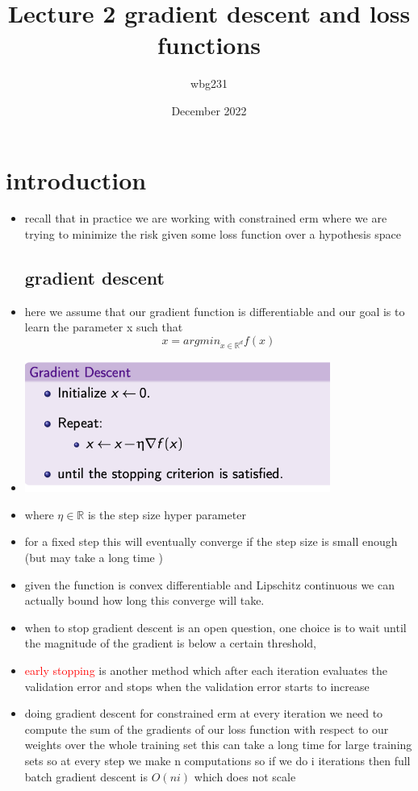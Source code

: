 \documentclass{article}
\title{Lecture 2 gradient descent and loss functions}
\author{wbg231 }
\date{December 2022}
\begin{document}
\maketitle

\section{introduction}
\begin{itemize}
\item recall that in practice we are working with constrained erm where we are trying to minimize the risk given some loss function over a  hypothesis space
\subsection*{gradient descent}
\item here we assume that our gradient function is differentiable and our goal is to learn the parameter x such that $$x=argmin_{x\in \mathbb{R}^d}f(x)$$
\item \includegraphics*[width=10cm]{images/Screenshot 2023-05-10 at 8.19.53 PM.png}
\item where $\eta\in \mathbb{R}$ is the step size hyper parameter
\item for a fixed step this will eventually converge if the step size is small enough (but may take a long time )
\item given the function is convex differentiable and Lipschitz continuous we can actually bound how long this converge will take. 
\item when to stop gradient descent is an open question, one choice is to wait until the magnitude of the gradient is below a certain threshold, 
\item \textcolor{red}{early stopping } is another method which after each iteration evaluates the validation error and stops when the validation error starts to increase
\item doing gradient descent for constrained erm at every iteration we need to compute the sum of the gradients of our loss function with respect to our weights over the whole training set this can take a long time for large training sets so at every step we make n computations so if we do i iterations then full batch gradient descent is $O(ni)$ which does not scale  

\end{itemize}
\end{document}

